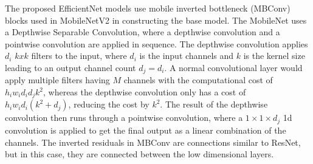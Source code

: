 The proposed EfficientNet models use mobile inverted bottleneck (MBConv) blocks used in MobileNetV2 \citep{mobileNetv2} in constructing the base model. The MobileNet uses a Depthwise Separable Convolution, where a depthwise convolution and a pointwise convolution are applied in sequence. The depthwise convolution applies ${d_i}$ ${k x k}$ filters to the input, where ${d_i}$ is the input channels and ${k}$ is the kernel size leading to an output channel count ${d_j = d_i}$. A normal convolutional layer would apply multiple filters having ${M}$ channels with the computational cost of ${h_i w_i d_i d_j k^2}$, whereas the depthwise convolution only has a cost of ${h_i w_i d_i (k^2 + d_j)}$, reducing the cost by ${k^2}$. The result of the depthwise convolution then runs through a pointwise convolution, where a ${1 \times 1 \times d_j}$ 1d convolution is applied to get the final output as a linear combination of the channels. The inverted residuals in MBConv are connections similar to ResNet, but in this case, they are connected between the low dimensional layers.
